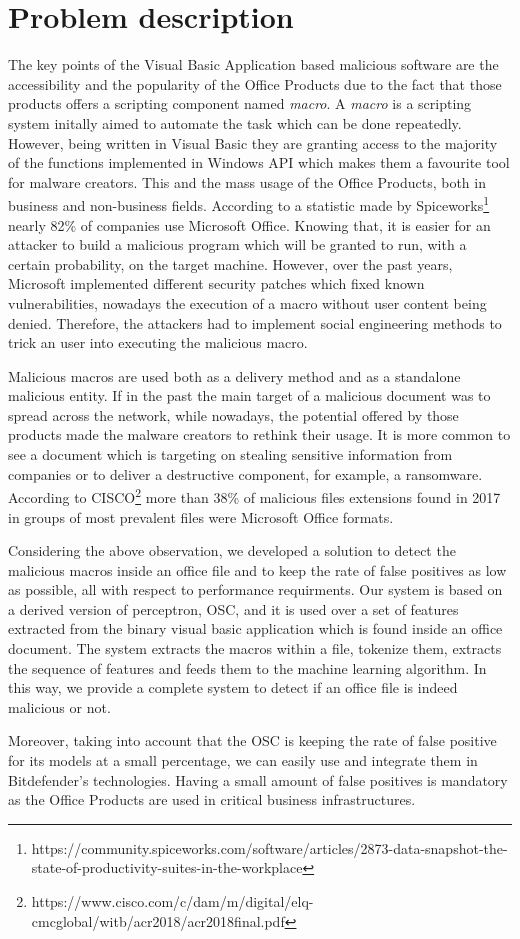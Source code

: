 \section{Problem description}

The key points of the Visual Basic Application based malicious software are the accessibility and the popularity of the Office Products due to the fact that those products offers a scripting component named \textit{macro}. A \textit{macro} is a scripting system initally aimed to automate the task which can be done repeatedly. However, being written in Visual Basic they are granting access to the majority of the functions implemented in Windows API which makes them a favourite tool for malware creators. This and the mass usage of the Office Products, both in business and non-business fields. According to a statistic made by Spiceworks\footnote{https://community.spiceworks.com/software/articles/2873-data-snapshot-the-state-of-productivity-suites-in-the-workplace} nearly 82\% of companies use Microsoft Office. Knowing that, it is easier for an attacker to build a malicious program which will be granted to run, with a certain probability, on the target machine. However, over the past years, Microsoft implemented different security patches which fixed known vulnerabilities, nowadays the execution of a macro without user content being denied. Therefore, the attackers had to implement social engineering methods to trick an user into executing the malicious macro.
\par
Malicious macros are used both as a delivery method and as a standalone malicious entity. If in the past the main target of a malicious document was to spread across the network, while nowadays, the potential offered by those products made the malware creators to rethink their usage. It is more common to see a document which is targeting on stealing sensitive information from companies or to deliver a destructive component, for example, a ransomware. According to CISCO\footnote{https://www.cisco.com/c/dam/m/digital/elq-cmcglobal/witb/acr2018/acr2018final.pdf} more than 38\% of malicious files extensions found in 2017 in groups of most prevalent files were Microsoft Office formats.
\par
Considering the above observation, we developed a solution to detect the malicious macros inside an office file and to keep the rate of false positives as low as possible, all with respect to performance requirments. Our system is based on a derived version of perceptron, OSC\cite{OSC}, and it is used over a set of features extracted from the binary visual basic application which is found inside an office document. The system extracts the macros within a file, tokenize them, extracts the sequence of features and feeds them to the machine learning algorithm. In this way, we provide a complete system to detect if an office file is indeed malicious or not.
\par
Moreover, taking into account that the OSC is keeping the rate of false positive for its models at a small percentage, we can easily use and integrate them in Bitdefender's technologies. Having a small amount of false positives is mandatory as the Office Products are used in critical business infrastructures.
